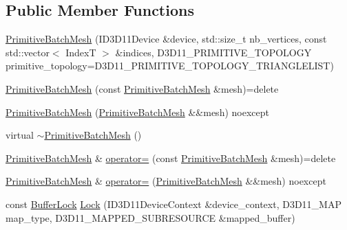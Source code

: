 \subsection*{Public Member Functions}
\begin{DoxyCompactItemize}
\item 
\mbox{\hyperlink{classmage_1_1rendering_1_1_primitive_batch_mesh_a9971577eb819b1b2c97ff867cd031942}{Primitive\+Batch\+Mesh}} (I\+D3\+D11\+Device \&device, std\+::size\+\_\+t nb\+\_\+vertices, const std\+::vector$<$ IndexT $>$ \&indices, D3\+D11\+\_\+\+P\+R\+I\+M\+I\+T\+I\+V\+E\+\_\+\+T\+O\+P\+O\+L\+O\+GY primitive\+\_\+topology=D3\+D11\+\_\+\+P\+R\+I\+M\+I\+T\+I\+V\+E\+\_\+\+T\+O\+P\+O\+L\+O\+G\+Y\+\_\+\+T\+R\+I\+A\+N\+G\+L\+E\+L\+I\+ST)
\item 
\mbox{\hyperlink{classmage_1_1rendering_1_1_primitive_batch_mesh_a9f20b29914746fbb29b8c5146f7f63a2}{Primitive\+Batch\+Mesh}} (const \mbox{\hyperlink{classmage_1_1rendering_1_1_primitive_batch_mesh}{Primitive\+Batch\+Mesh}} \&mesh)=delete
\item 
\mbox{\hyperlink{classmage_1_1rendering_1_1_primitive_batch_mesh_ac46a8538b295cf4d85c7309d2bb4cdd5}{Primitive\+Batch\+Mesh}} (\mbox{\hyperlink{classmage_1_1rendering_1_1_primitive_batch_mesh}{Primitive\+Batch\+Mesh}} \&\&mesh) noexcept
\item 
virtual \mbox{\hyperlink{classmage_1_1rendering_1_1_primitive_batch_mesh_a96bb7d8ce20047163ec851b426087c80}{$\sim$\+Primitive\+Batch\+Mesh}} ()
\item 
\mbox{\hyperlink{classmage_1_1rendering_1_1_primitive_batch_mesh}{Primitive\+Batch\+Mesh}} \& \mbox{\hyperlink{classmage_1_1rendering_1_1_primitive_batch_mesh_a64b661150ec319d4dab092d44315bb67}{operator=}} (const \mbox{\hyperlink{classmage_1_1rendering_1_1_primitive_batch_mesh}{Primitive\+Batch\+Mesh}} \&mesh)=delete
\item 
\mbox{\hyperlink{classmage_1_1rendering_1_1_primitive_batch_mesh}{Primitive\+Batch\+Mesh}} \& \mbox{\hyperlink{classmage_1_1rendering_1_1_primitive_batch_mesh_a36409f6de1208f30069309675b19feb2}{operator=}} (\mbox{\hyperlink{classmage_1_1rendering_1_1_primitive_batch_mesh}{Primitive\+Batch\+Mesh}} \&\&mesh) noexcept
\item 
const \mbox{\hyperlink{classmage_1_1rendering_1_1_buffer_lock}{Buffer\+Lock}} \mbox{\hyperlink{classmage_1_1rendering_1_1_primitive_batch_mesh_afce7767a0e3496477c14f145c3c2bfe7}{Lock}} (I\+D3\+D11\+Device\+Context \&device\+\_\+context, D3\+D11\+\_\+\+M\+AP map\+\_\+type, D3\+D11\+\_\+\+M\+A\+P\+P\+E\+D\+\_\+\+S\+U\+B\+R\+E\+S\+O\+U\+R\+CE \&mapped\+\_\+buffer)
\end{DoxyCompactItemize}
